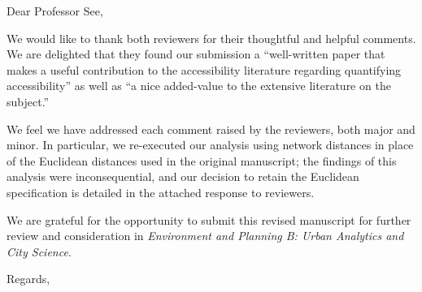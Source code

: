 \documentclass[11pt]{letter} %
\begin{document}

\begin{letter}{
}


\opening{Dear Professor See,}

We would like to thank both reviewers for their thoughtful and helpful comments. We are delighted that they found our submission a “well-written paper that makes a useful contribution to the accessibility literature regarding quantifying accessibility” as well as “a nice added-value to the extensive literature on the subject.”

We feel we have addressed each comment raised by the reviewers, both major and minor. In particular, we re-executed our analysis using network distances in place of the Euclidean distances used in the original manuscript; the findings of this analysis were inconsequential, and our decision to retain the Euclidean specification is detailed in the attached response to reviewers.

We are grateful for the opportunity to submit this revised manuscript for further review and consideration in {\em Environment and Planning B: Urban Analytics and City Science}.


\closing{Regards,}




\end{letter}
\end{document}
